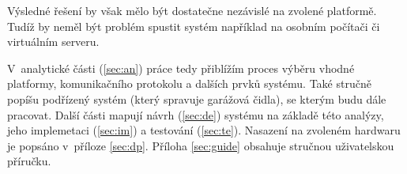 Výsledné řešení by však mělo být dostatečne nezávislé na zvolené platformě. Tudíž by neměl být problém spustit systém například na osobním počítači či virtuálním serveru.

V~analytické části (\ref{sec:an}) práce tedy přiblížím proces výběru vhodné platformy, komunikačního protokolu a dalších prvků systému. Také stručně popíšu podřízený systém (který spravuje garážová čidla), se kterým budu dále pracovat. Další části mapují návrh (\ref{sec:de}) systému na základě této analýzy, jeho implemetaci (\ref{sec:im}) a testování (\ref{sec:te}). Nasazení na zvoleném hardwaru je popsáno v~příloze \ref{sec:dp}. Příloha \ref{sec:guide} obsahuje stručnou uživatelskou příručku.